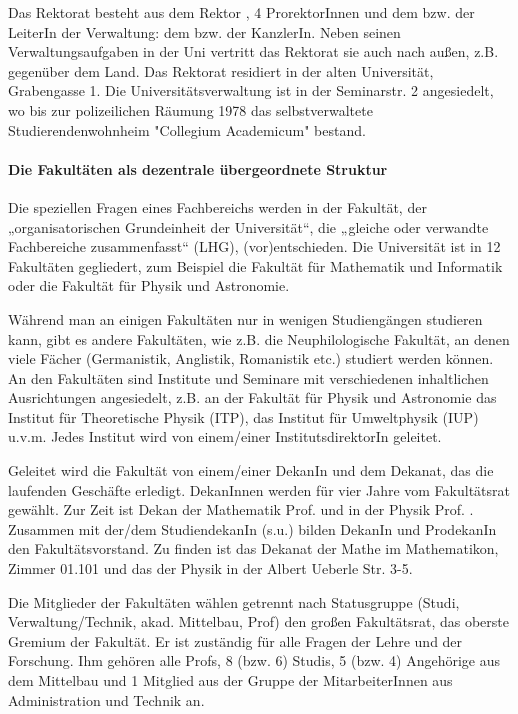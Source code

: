 Das Rektorat besteht aus dem Rektor \rektor, 4 ProrektorInnen und dem bzw. der LeiterIn der Verwaltung: dem bzw. der KanzlerIn. Neben seinen Verwaltungsaufgaben in der Uni vertritt das Rektorat sie auch nach außen, z.B. gegenüber dem Land. Das Rektorat residiert in der alten Universität, Grabengasse 1.
Die Universitätsverwaltung ist in der Seminarstr. 2 angesiedelt, wo bis zur polizeilichen Räumung 1978 das selbstverwaltete Studierendenwohnheim "Collegium Academicum" bestand.


\paragraph{Die Fakultäten als dezentrale übergeordnete Struktur}

Die speziellen Fragen eines Fachbereichs werden in der Fakultät, der
„organisatorischen Grundeinheit der Universität“, die „gleiche oder
verwandte Fachbereiche zusammenfasst“ (LHG), (vor)entschieden. Die
Universität ist in 12 Fakultäten gegliedert, zum Beispiel die Fakultät für
Mathematik und Informatik oder die Fakultät für Physik und Astronomie.

Während man an einigen Fakultäten nur in wenigen Studiengängen studieren
kann, gibt es andere Fakultäten, wie z.B. die Neuphilologische Fakultät,
an denen viele Fächer (Germanistik, Anglistik, Romanistik etc.) studiert
werden können. An den Fakultäten sind Institute und Seminare mit verschiedenen inhaltlichen Ausrichtungen angesiedelt, z.B. an der Fakultät für Physik und Astronomie das Institut für Theoretische Physik (ITP), das Institut für Umweltphysik (IUP) u.v.m. Jedes Institut wird von einem/einer InstitutsdirektorIn geleitet.

Geleitet wird die Fakultät von einem/einer DekanIn und dem Dekanat, das die laufenden Geschäfte erledigt. DekanInnen werden für vier Jahre vom Fakultätsrat gewählt. Zur Zeit ist Dekan der Mathematik Prof. \dekanmathe{} und in der Physik Prof. \dekanphysik. Zusammen mit der/dem
StudiendekanIn (s.u.) bilden DekanIn und ProdekanIn den Fakultätsvorstand. Zu finden ist das Dekanat der Mathe im \Gls{Mathematikon}, Zimmer 01.101 und das der Physik in der Albert Ueberle Str. 3-5.

Die Mitglieder der Fakultäten wählen getrennt nach Statusgruppe (Studi, Verwaltung/Technik, akad. Mittelbau, Prof) den großen Fakultätsrat, das oberste Gremium der Fakultät. Er ist zuständig für alle Fragen der Lehre und der Forschung. Ihm gehören alle Profs, 8 (bzw. 6) Studis, 5 (bzw. 4) Angehörige aus dem Mittelbau und 1 Mitglied aus der Gruppe der MitarbeiterInnen aus Administration und Technik an.

